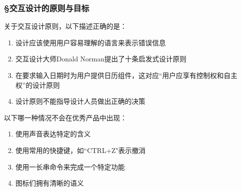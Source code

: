 \subsubsection*{\S 交互设计的原则与目标}
\setcounter{problemname}{0}

\begin{problem}
	关于交互设计原则，以下描述正确的是：
        \begin{enumerate}[label=\Alph*.]
            \item 设计应该使用用户容易理解的语言来表示错误信息
            \item 交互设计大师Donald Norman提出了十条启发式设计原则
            \item 在要求输入日期时为用户提供日历组件，这对应“用户应享有控制权和自主权”的设计原则
            \item 设计原则不能指导设计人员做出正确的决策
        \end{enumerate}
\end{problem}



\begin{problem}
	以下哪一种情况不会在优秀产品中出现：
    \vspace{-0.8em}
    \begin{multicols}{2}
        \begin{enumerate}[label=\Alph*.]
            \item 使用声音表达特定的含义
            \item 使用常用的快捷键，如``CTRL+Z"表示撤消
            \item 使用一长串命令来完成一个特定功能
            \item 图标们拥有清晰的语义
        \end{enumerate}
    \end{multicols}
    \vspace{-1em}
\end{problem}



